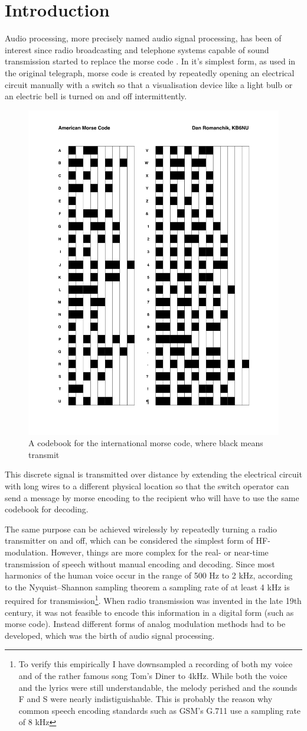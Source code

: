 \chapter{Introduction}
\label{Introduction}

Audio processing, more precisely named audio signal processing, has been of interest since radio broadcasting and telephone systems capable of sound transmission started to replace the morse code \cite{spanias2006audio}. In it's simplest form, as used in the original telegraph, morse code is created by repeatedly opening an electrical circuit manually with a switch so that a visualisation device like a light bulb or an electric bell is turned on and off intermittently. 


\begin{figure}[H]
    \centering
	\includegraphics[width=.45\textwidth]{./images/illustrations/morse-chart}
    \caption{A codebook for the international morse code, where black means transmit}
    \label{fig:morse}
\end{figure}

This discrete signal is transmitted over distance by extending the electrical circuit with long wires to a different physical location so that the switch operator can send a message by morse encoding to the recipient who will have to use the same codebook for decoding.

The same purpose can be achieved wirelessly by repeatedly turning a radio transmitter on and off, which can be considered the simplest form of HF-modulation. However, things are more complex for the real- or near-time transmission of speech without manual encoding and decoding. Since most harmonics of the human voice occur in the range of 500 Hz to 2 kHz, according to the Nyquist–Shannon sampling theorem a sampling rate of at least 4 kHz is required for transmission\footnote{To verify this empirically I have downsampled a recording of both my voice and of the rather famous song Tom's Diner to 4kHz. While both the voice and the lyrics were still understandable, the melody perished and the sounds F and S were nearly indistiguishable. This is probably the reason why common speech encoding standards such as GSM's G.711 use a sampling rate of 8 kHz}. When radio transmission was invented in the late 19th century, it was not feasible to encode this information in a digital form (such as morse code). Instead different forms of analog modulation methods had to be developed, which was the birth of audio signal processing.

